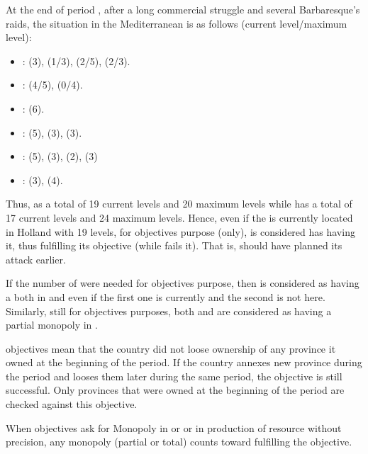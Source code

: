 \begin{exemple}
  At the end of period , after a long commercial struggle
  and several Barbaresque's raids, the situation in the Mediterranean is
  as follows (current level/maximum level):
  \begin{itemize}
  \item {}: \HOL (3), \HIS (1/3), \VEN (2/5), \FRA (2/3).
  \item {}: \HOL(4/5), \VEN (0/4).
  \item {}: \VEN (6).
  \item {}: \TUR (5), \VEN (3), \HOL (3).
  \item {}: \HOL (5), \VEN (3), \TUR (2), \FRA (3)
  \item {}: \VEN (3), \HOL (4).
  \end{itemize}
  Thus, \HOL as a total of 19 current levels and 20 maximum levels while
  \VEN has a total of 17 current levels and 24 maximum levels. Hence,
  even if the  is currently located in Holland with 19
  levels, for objectives purpose (only), \VEN is considered has having
  it, thus fulfilling its objective (while \HOL fails it). That is, \HOL
  should have planned its attack earlier.

  If the number of \TradeFLEET were needed for objectives purpose, then
  \VEN is considered as having a \TradeFLEET\faceplus both in 
  and  even if the first one is currently \Facemoins and
  the second is not here. Similarly, still for objectives purposes, both
  \HOL and \VEN are considered as having a partial monopoly in
  .
\end{exemple}

 objectives mean that the country did not loose
ownership of any province it owned at the beginning of the period.
\bparag If the country annexes new province during the period and looses
them later during the same period, the objective is still
successful. Only provinces that were owned at the beginning of the
period are checked against this objective.

 When objectives ask for Monopoly in \STZ
or \CTZ or in production of resource without precision, any monopoly
(partial or total) counts toward fulfilling the objective.

